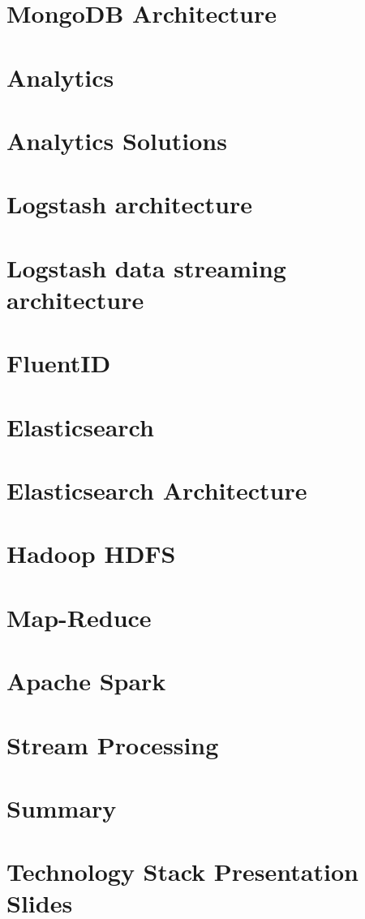 \documentclass[11pt]{article}
\begin{document}
\section{MongoDB Architecture}

\section{Analytics}

\section{Analytics Solutions}

\section{Logstash architecture}

\section{Logstash data streaming architecture}

\section{FluentID}

\section{Elasticsearch}

\section{Elasticsearch Architecture}

\section{Hadoop HDFS}

\section{Map-Reduce}

\section{Apache Spark}

\section{Stream Processing}

\section{Summary}

\section{Technology Stack Presentation Slides}
    
\end{document}
